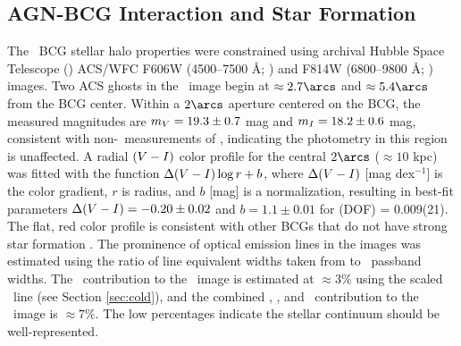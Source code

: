 \documentclass[11pt, preprint]{aastex}
\begin{document}
\subsection{AGN-BCG Interaction and Star Formation}
\label{sec:bcg}

The \rbs\ BCG stellar halo properties were constrained using archival
Hubble Space Telescope (\hst) ACS/WFC F606W (4500--7500 \AA; \myv) and
F814W (6800--9800 \AA; \myi) images. Two ACS ghosts \citep{acsghost}
in the \myi\ image begin at $\approx 2.7\arcs$ and $\approx 5.4\arcs$
from the BCG center. Within a $2\arcs$ aperture centered on the BCG,
the measured magnitudes are $m_{V} = 19.3 \pm 0.7$ mag and
$m_{I} = 18.2 \pm 0.6$ mag, consistent with non-\hst\ measurements
of \citet{rbs1}, indicating the photometry in this region is
unaffected. A radial $(V-I)$ color profile for the central
$2\arcs$ ($\approx 10$ kpc) was fitted with the function
$\Delta(V-I) \log r + b$, where $\Delta(V-I)$ [mag
  dex$^{-1}$] is the color gradient, $r$ is radius, and $b$ [mag] is a
normalization, resulting in best-fit parameters $\Delta(V-I) =
-0.20 \pm 0.02$ and $b = 1.1 \pm 0.01$ for \chisq(DOF) =
0.009(21). The flat, red color profile is consistent with other BCGs
that do not have strong star formation \citep[\eg][]{rafferty06}. The
prominence of optical emission lines in the images was estimated using
the ratio of line equivalent widths taken from \citet{rbs1} to
\hst\ passband widths. The \halpha\ contribution to the \myi\ image is
estimated at $\approx 3\%$ using the scaled \hbeta\ line (see Section
\ref{sec:cold}), and the combined \hbeta, \oii, and
\oiii\ contribution to the \myv\ image is $\approx 7\%$. The low
percentages indicate the stellar continuum should be well-represented.
\end{document}
